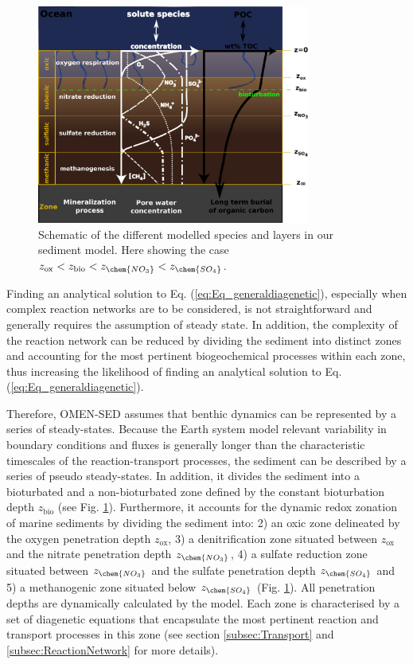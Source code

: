 \documentclass[gmd, manuscript]{copernicus}
\begin{document}
\begin{figure}[htbp]
\begin{center}
	\includegraphics[width=0.8\textwidth]{figures/Sediment-model-with-profiles.pdf}
	\caption{Schematic of the different modelled species and layers in our sediment model. Here showing the case $z_{\mathrm{ox}} < z_{\mathrm{bio}} < z_{\chem{NO_3}} < z_{\chem{SO_4}}$.}
	\label{fig:Sediment_layers}
	\end{center}
\end{figure}

Finding an analytical solution to  Eq. (\ref{eq:Eq_generaldiagenetic}), especially when complex reaction networks are to be considered, is not straightforward and generally requires the assumption of steady state. 
In addition, the complexity of the reaction network can be reduced by dividing the sediment into distinct zones and accounting for the most pertinent biogeochemical processes 
within each zone, thus increasing the likelihood of finding an analytical solution to Eq. (\ref{eq:Eq_generaldiagenetic}). 

Therefore, OMEN-SED assumes that benthic dynamics can be represented by a series of steady-states. 
Because the Earth system model relevant variability in boundary conditions and fluxes is generally longer than the characteristic timescales of the reaction-transport processes, the sediment can be described by a 
series of pseudo steady-states. In addition, it divides the sediment into a bioturbated and a non-bioturbated zone defined by the constant bioturbation depth $z_{\mathrm{bio}}$ (see Fig. \ref{fig:Sediment_layers}). 
Furthermore, it accounts for the dynamic redox zonation of marine sediments by dividing the sediment into: 2) an oxic zone delineated by the oxygen 
penetration depth $z_{\mathrm{ox}}$, 3) a denitrification zone situated between $z_{\mathrm{ox}}$ and the nitrate penetration depth $z_{\chem{NO_3}}$, 4) 
a sulfate reduction zone situated between $z_{\chem{NO_3}}$ and the sulfate penetration depth $z_{\chem{SO_4}}$ and 5) a methanogenic zone situated below $z_{\chem{SO_4}}$ (Fig. \ref{fig:Sediment_layers}). 
All penetration depths are dynamically calculated by the model. 
Each zone is characterised by a set of diagenetic equations that encapsulate the most pertinent reaction and transport processes in this zone (see section \ref{subsec:Transport} and \ref{subsec:ReactionNetwork} 
for more details). 
\end{document}
